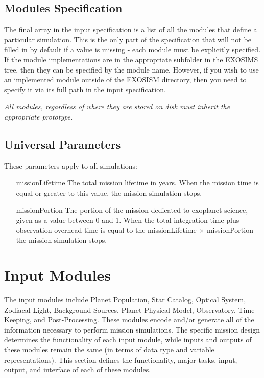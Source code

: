 \documentclass[cleanfoot]{asme2ej}
\begin{document}
\subsection{Modules Specification}
The final array in the input specification is a list of all the modules that define a particular simulation.  This is the only part of the specification that will not be filled in by default if a value is missing - each module must be explicitly specified.  If the module implementations are in the appropriate subfolder in the EXOSIMS tree, then they can be specified by the module name.  However, if you wish to use an implemented module outside of the EXOSISM directory, then you need to specify it via its full path in the input specification.

\emph{All modules, regardless of where they are stored on disk must inherit the appropriate prototype.}

\subsection{Universal Parameters}
These parameters apply to all simulations:

\begin{itemize}[leftmargin=1in,font={\ttfamily}]
\item[missionLifetime]  The total mission lifetime in years.  When the mission time is equal or greater to this value, the mission simulation stops.
\item[missionPortion]  The portion of the mission dedicated to exoplanet science, given as a value between 0 and 1.  When the total integration time plus observation overhead time is equal to the missionLifetime $\times$ missionPortion the mission simulation stops.
\end{itemize}


\section{Input Modules}\label{sec:modules}
The input modules include Planet Population, Star Catalog, Optical System, Zodiacal Light, Background Sources, Planet Physical Model, Observatory, Time Keeping, and Post-Processing.  These modules encode and/or generate all of the information necessary to perform mission simulations.  The specific mission design determines the functionality of each input module, while inputs and outputs of these modules remain the same (in terms of data type and variable representations).  This section defines the functionality, major tasks, input, output, and interface of each of these modules.
\end{document}
